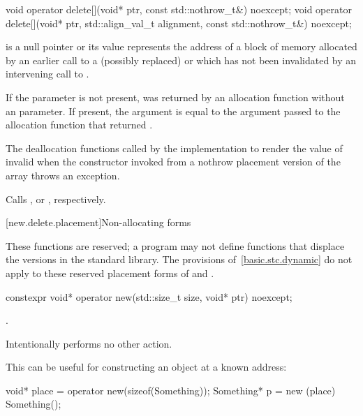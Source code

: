 %
\begin{itemdecl}
void operator delete[](void* ptr, const std::nothrow_t&) noexcept;
void operator delete[](void* ptr, std::align_val_t alignment, const std::nothrow_t&) noexcept;
\end{itemdecl}

\begin{itemdescr}
\pnum
\expects
{} is a null pointer or
its value represents the address of
a block of memory allocated by
an earlier call to a (possibly replaced)
or
which has not been invalidated by an intervening call to
.

\pnum
If the  parameter is not present,
 was returned by an allocation function
without an  parameter.
If present, the  argument
is equal to the  argument
passed to the allocation function that returned .

\pnum
\effects
The
deallocation functions
called by the implementation
to render the value of  invalid
when the constructor invoked from a nothrow
placement version of the array  throws an exception.

\pnum
\replaceable
{}

\pnum
{}
Calls ,
or ,
respectively.
\end{itemdescr}

[new.delete.placement]{Non-allocating forms}

\pnum
These functions are reserved; a \Cpp{} program may not define functions that displace
the versions in the \Cpp{} standard library.
The provisions of~\ref{basic.stc.dynamic} do not apply to these reserved
placement forms of  and .

%
\begin{itemdecl}
constexpr void* operator new(std::size_t size, void* ptr) noexcept;
\end{itemdecl}

\begin{itemdescr}
\pnum
\returns
{}.

\pnum
\remarks
Intentionally performs no other action.

\pnum
\begin{example}
This can be useful for constructing an object at a known address:

\begin{codeblock}
void* place = operator new(sizeof(Something));
Something* p = new (place) Something();
\end{codeblock}
\end{example}
\end{itemdescr}

